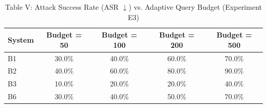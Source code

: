 \begin{table}[t]
\centering
\caption{Table V: Attack Success Rate (ASR $\downarrow$) vs. Adaptive Query Budget (Experiment E3)}
\begin{tabular}{l c c c c}
\hline
\textbf{System} & \textbf{Budget = 50} & \textbf{Budget = 100} & \textbf{Budget = 200} & \textbf{Budget = 500} \\
\hline
B1 & 30.0\% & 40.0\% & 60.0\% & 70.0\% \\
B2 & 40.0\% & 60.0\% & 80.0\% & 90.0\% \\
B3 & 10.0\% & 20.0\% & 20.0\% & 40.0\% \\
B6 & 30.0\% & 40.0\% & 50.0\% & 70.0\% \\
\hline
\end{tabular}
\end{table}
